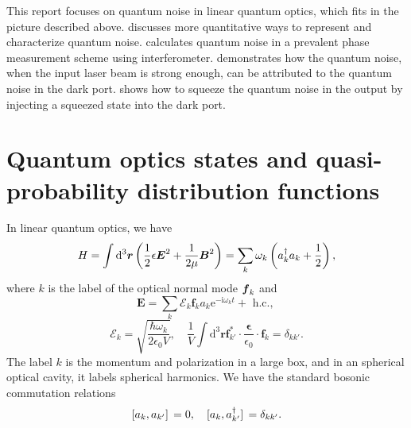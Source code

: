 \documentclass[hyperref, a4paper]{article}
\begin{document}
This report focuses on quantum noise in linear quantum optics,
which fits in the picture described above.
 discusses more quantitative ways to represent and characterize quantum noise.
 calculates quantum noise 
in a prevalent phase measurement scheme using interferometer.
 demonstrates how the quantum noise, 
when the input laser beam is strong enough,
can be attributed to the quantum noise in the dark port.
 shows how to squeeze the quantum noise in the output 
by injecting a squeezed state into the dark port.

\section{Quantum optics states and quasi-probability distribution functions}\label{sec:overview-rep}

In linear quantum optics, we have \cite{steck2007quantum} 
\begin{equation}
    H = \int \dd[3]{\vb*{r}} \left( \frac{1}{2} \epsilon \vb*{E}^2 + \frac{1}{2 \mu} \vb*{B}^2 \right)
    = \sum_{k} \omega_k \left( a^\dagger_k a_k + \frac{1}{2} \right),
\end{equation}
where $k$ is the label of the optical normal mode $\vb*{f}_k$ and 
\begin{equation}
    \boldsymbol{E}=\sum_k \mathcal{E}_k \boldsymbol{f}_k a_k \mathrm{e}^{-\mathrm{i} \omega_k t}+\text { h.c., } 
\end{equation}
\begin{equation}
    \mathcal{E}_k = \sqrt{\frac{\hbar \omega_k}{2 \epsilon_0 V}} , \quad \frac{1}{V} \int \mathrm{d}^3 \boldsymbol{r} \boldsymbol{f}_{k'}^* \cdot \frac{\boldsymbol{\epsilon}}{\epsilon_0} \cdot \boldsymbol{f}_k =\delta_{k k'} .
\end{equation}
The label $k$ is the momentum and polarization in a large box, 
and in an spherical optical cavity, it labels spherical harmonics.
We have the standard bosonic commutation relations 
\begin{equation}
    \comm*{a_k}{a_{k'}} = 0, \quad \comm*{a_k}{a^\dagger_{k'}} = \delta_{k k'}.
\end{equation}
\end{document}
